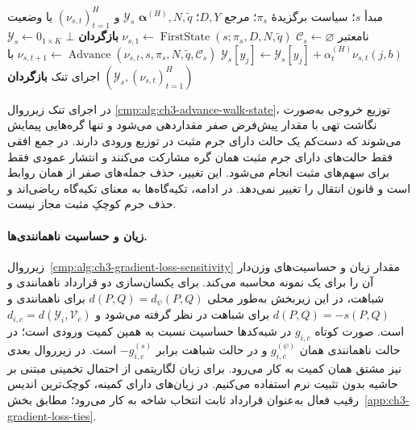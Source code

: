 \begin{algorithm}[!htbp]
\caption{زیرروال $\operatorname{ForwardTrace}$: بازنمایی برچسبی و توزیع‌های گام‌ها}
\label{cmp:alg:ch3-gradient-forward-trace}
\begin{algorithmic}[1]
\REQUIRE مبدأ $s$؛ سیاست برگزیدهٔ $\pi_s$؛ مرجع $D,Y$؛
$\boldsymbol\alpha^{(H)},N,\widetilde q$
\ENSURE $\mathscr Y_s$ و $(\nu_{s,t})_{t=1}^{H}$ یا وضعیت نامعتبر
\STATE $\mathcal C_s\gets\varnothing$
\STATE $\nu_{s,1}\gets\operatorname{FirstState}(s;\pi_s,D,N,\widetilde q)$
    \STATE \textbf{بازگردان} $\bot$
\ENDIF
\STATE $\mathscr Y_s\gets0_{1\times K}$
        \STATE $\mathscr Y_s[y_j]\gets\mathscr Y_s[y_j]
        +\alpha_t^{(H)}\nu_{s,t}(j,b)$
    \ENDFOR
        \STATE $\nu_{s,t+1}\gets
        \operatorname{Advance}(\nu_{s,t},s,\pi_s,N,\widetilde q,\mathcal C_s)$
        با اجرای تنک
    \ENDIF
\ENDFOR
\STATE \textbf{بازگردان} $(\mathscr Y_s,(\nu_{s,t})_{t=1}^{H})$
\end{algorithmic}
\end{algorithm}

در اجرای تنک زیرروال
\ref{cmp:alg:ch3-advance-walk-state}،
توزیع خروجی به‌صورت نگاشت تهی با مقدار
پیش‌فرض صفر مقداردهی می‌شود و تنها گره‌هایی
پیمایش می‌شوند که دست‌کم یک حالت دارای
جرم مثبت در توزیع ورودی دارند. در جمع
افقی فقط حالت‌های دارای جرم مثبت همان
گره مشارکت می‌کنند و انتشار عمودی فقط
برای سهم‌های مثبت انجام می‌شود.
این تغییر، حذف جمله‌های صفر از همان
روابط است و قانون انتقال را تغییر نمی‌دهد.
در ادامه، تکیه‌گاه‌ها به معنای تکیه‌گاه
ریاضی‌اند و حذف جرم کوچکِ مثبت مجاز نیست.

\paragraph{زیان و حساسیت ناهمانندی‌ها.}
زیرروال~\ref{cmp:alg:ch3-gradient-loss-sensitivity}
مقدار زیان و حساسیت‌های وزن‌دار آن را
برای یک نمونه محاسبه می‌کند. برای یکسان‌سازی
دو قرارداد ناهمانندی و شباهت، در این
زیربخش به‌طور محلی $d(P,Q)=d_\psi(P,Q)$
برای ناهمانندی و $d(P,Q)=-s(P,Q)$ برای
شباهت در نظر گرفته می‌شود و
$d_{i,c}=d(\mathscr Y_i,\mathcal V_c)$ است.
صورت کوتاه $g_{i,c}$ در شبه‌کدها حساسیت
نسبت به همین کمیت ورودی است؛ در حالت
ناهمانندی همان $g_{i,c}^{(\psi)}$ و در
حالت شباهت برابر $-g_{i,c}^{(s)}$ است.
در زیرروال بعدی نیز مشتق همان کمیت به کار
می‌رود. برای زیان لگاریتمی از احتمال تخمینی
مبتنی بر حاشیه بدون تثبیت نرم استفاده
می‌کنیم. در زیان‌های دارای کمینه، کوچک‌ترین
اندیس رقیب فعال به‌عنوان قرارداد ثابت
انتخاب شاخه به کار می‌رود؛ مطابق
بخش~\ref{app:ch3-gradient-loss-ties}.

